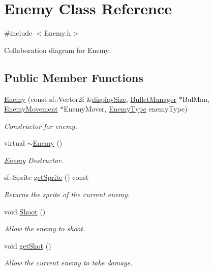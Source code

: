 \hypertarget{class_enemy}{}\section{Enemy Class Reference}
\label{class_enemy}


{\ttfamily \#include $<$Enemy.\+h$>$}



Collaboration diagram for Enemy\+:
\subsection*{Public Member Functions}
\begin{DoxyCompactItemize}
\item 
\hyperlink{class_enemy_aad76aec6e71a26cff30fd4bb1d5323d2}{Enemy} (const sf\+::\+Vector2f \&\hyperlink{_game_tests_8cpp_ac0230399c621da4679687e37351dba76}{display\+Size}, \hyperlink{class_bullet_manager}{Bullet\+Manager} $\ast$Bul\+Man, \hyperlink{class_enemy_movement}{Enemy\+Movement} $\ast$Enemy\+Mover, \hyperlink{_enemy_8h_ac3e413a86119db4b031458c7259e268e}{Enemy\+Type} enemy\+Type)
\begin{DoxyCompactList}\small\item\em Constructor for enemy. \end{DoxyCompactList}\item 
virtual \hyperlink{class_enemy_ac0eec4755e28c02688065f9657150ac3}{$\sim$\+Enemy} ()
\begin{DoxyCompactList}\small\item\em \hyperlink{class_enemy}{Enemy} Destructor. \end{DoxyCompactList}\item 
sf\+::\+Sprite \hyperlink{class_enemy_a8f769acc8f473846d11eaabf504a1089}{get\+Sprite} () const
\begin{DoxyCompactList}\small\item\em Returns the sprite of the current enemy. \end{DoxyCompactList}\item 
void \hyperlink{class_enemy_ab526cfaf13910e15ca1e5e84ef230dd1}{Shoot} ()
\begin{DoxyCompactList}\small\item\em Allow the enemy to shoot. \end{DoxyCompactList}\item 
void \hyperlink{class_enemy_a2faee7be0abbf8d473ecd6d7ee084e60}{get\+Shot} ()
\begin{DoxyCompactList}\small\item\em Allow the current enemy to take damage. \end{DoxyCompactList}\item 

\end{DoxyCompactItemize}
